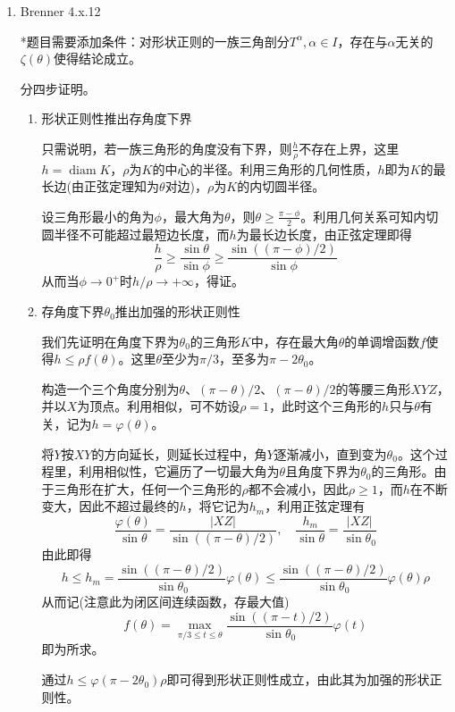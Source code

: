 \documentclass[a4paper,UTF8,fontset=windows,10pt]{ctexart}
\DeclareMathOperator*{\diam}{diam}
\begin{document}
\begin{enumerate}
    \item Brenner 4.x.12
    
    *题目需要添加条件：对形状正则的一族三角剖分$T^\alpha,\alpha\in I$，存在与$\alpha$无关的$\zeta(\theta)$使得结论成立。
    
    分四步证明。
    
    \begin{enumerate}[(1)]
        \item 形状正则性推出存角度下界
        
        只需说明，若一族三角形的角度没有下界，则$\frac{h}{\rho}$不存在上界，这里$h=\diam K$，$\rho$为$K$的中心的半径。利用三角形的几何性质，$h$即为$K$的最长边(由正弦定理知为$\theta$对边)，$\rho$为$K$的内切圆半径。
    
        设三角形最小的角为$\phi$，最大角为$\theta$，则$\theta\ge\frac{\pi-\phi}{2}$。利用几何关系可知内切圆半径不可能超过最短边长度，而$h$为最长边长度，由正弦定理即得
        $$\frac{h}{\rho}\ge\frac{\sin\theta}{\sin\phi}\ge\frac{\sin((\pi-\phi)/2)}{\sin\phi}$$
        从而当$\phi\to0^+$时$h/\rho\to+\infty$，得证。
    
        \item 存角度下界$\theta_0$推出加强的形状正则性
        
        我们先证明在角度下界为$\theta_0$的三角形$K$中，存在最大角$\theta$的单调增函数$f$使得$h\le\rho f(\theta)$。这里$\theta$至少为$\pi/3$，至多为$\pi-2\theta_0$。
    
        构造一个三个角度分别为$\theta$、$(\pi-\theta)/2$、$(\pi-\theta)/2$的等腰三角形$XYZ$，并以$X$为顶点。利用相似，可不妨设$\rho=1$，此时这个三角形的$h$只与$\theta$有关，记为$h=\varphi(\theta)$。
    
        将$Y$按$XY$的方向延长，则延长过程中，角$Y$逐渐减小，直到变为$\theta_0$。这个过程里，利用相似性，它遍历了一切最大角为$\theta$且角度下界为$\theta_0$的三角形。由于三角形在扩大，任何一个三角形的$\rho$都不会减小，因此$\rho\ge1$，而$h$在不断变大，因此不超过最终的$h$，将它记为$h_m$，利用正弦定理有
        $$\frac{\varphi(\theta)}{\sin\theta}=\frac{|XZ|}{\sin((\pi-\theta)/2)},\quad\frac{h_m}{\sin\theta}=\frac{|XZ|}{\sin\theta_0}$$
        由此即得
        $$h\le h_m=\frac{\sin((\pi-\theta)/2)}{\sin\theta_0}\varphi(\theta)\le\frac{\sin((\pi-\theta)/2)}{\sin\theta_0}\varphi(\theta)\rho$$
        从而记(注意此为闭区间连续函数，存最大值)
        $$f(\theta)=\max_{\pi/3\le t\le\theta}\frac{\sin((\pi-t)/2)}{\sin\theta_0}\varphi(t)$$
        即为所求。
    
        通过$h\le\varphi(\pi-2\theta_0)\rho$即可得到形状正则性成立，由此其为加强的形状正则性。
    

\end{enumerate}
\end{enumerate}
\end{document}
